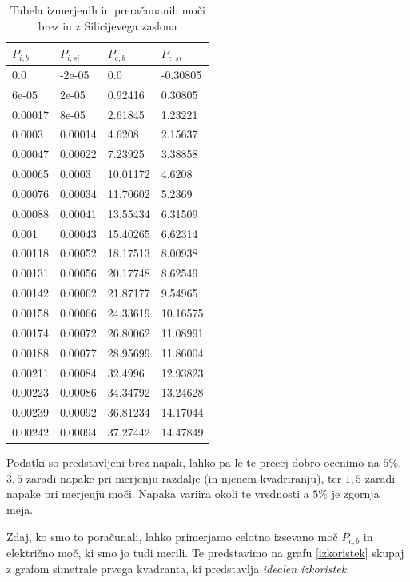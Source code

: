 \documentclass[10pt]{article}
\begin{document}
\begin{table}[!ht]
    \centering
    \begin{tabular}{l|l|l|l}
        $P_{i,b}$ & $P_{i,si}$ & $P_{c,b}$ & $P_{c,si}$ \\ \hline
        0.0 & -2e-05 & 0.0 & -0.30805 \\ 
        6e-05 & 2e-05 & 0.92416 & 0.30805 \\ 
        0.00017 & 8e-05 & 2.61845 & 1.23221 \\ 
        0.0003 & 0.00014 & 4.6208 & 2.15637 \\ 
        0.00047 & 0.00022 & 7.23925 & 3.38858 \\ 
        0.00065 & 0.0003 & 10.01172 & 4.6208 \\ 
        0.00076 & 0.00034 & 11.70602 & 5.2369 \\ 
        0.00088 & 0.00041 & 13.55434 & 6.31509 \\ 
        0.001 & 0.00043 & 15.40265 & 6.62314 \\ 
        0.00118 & 0.00052 & 18.17513 & 8.00938 \\ 
        0.00131 & 0.00056 & 20.17748 & 8.62549 \\ 
        0.00142 & 0.00062 & 21.87177 & 9.54965 \\ 
        0.00158 & 0.00066 & 24.33619 & 10.16575 \\ 
        0.00174 & 0.00072 & 26.80062 & 11.08991 \\ 
        0.00188 & 0.00077 & 28.95699 & 11.86004 \\ 
        0.00211 & 0.00084 & 32.4996 & 12.93823 \\ 
        0.00223 & 0.00086 & 34.34792 & 13.24628 \\ 
        0.00239 & 0.00092 & 36.81234 & 14.17044 \\ 
        0.00242 & 0.00094 & 37.27442 & 14.47849 \\ 
    \end{tabular}
    \caption{Tabela izmerjenih in preračunanih moči brez in z Silicijevega zaslona}
    \label{moči}
\end{table}

\noindent Podatki so predstavljeni brez napak, lahko pa le te precej dobro ocenimo na $5\%$, $3,5$ zaradi napake pri merjenju razdalje (in njenem kvadriranju), ter $1,5$ zaradi napake pri merjenju moči. Napaka variira okoli te vrednosti a $5\%$ je zgornja meja.

Zdaj, ko smo to poračunali, lahko primerjamo celotno izsevano moč $P_{c,b}$ in električno moč, ki smo jo tudi merili. Te predstavimo na grafu \ref{izkoristek} skupaj z grafom simetrale prvega kvadranta, ki predstavlja \textit{idealen izkoristek}.
\end{document}
